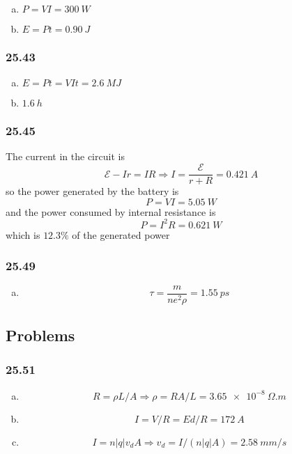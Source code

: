 \documentclass{article}
\begin{document}
\begin{enumerate}[(a)]
  \item $P = V I = \qty{300}{W}$

  \item $E = P t = \qty{0.90}{J}$
\end{enumerate}

\subsubsection{25.43}

\begin{enumerate}[(a)]
  \item $E = P t = V I t = \qty{2.6}{MJ}$

        \setcounter{enumi}{2}
  \item $\qty{1.6}{h}$
\end{enumerate}

\subsubsection{25.45}

The current in the circuit is \[\mathcal{E} - I r = I R \Rightarrow I = \frac{\mathcal{E}}{r + R} = \qty{0.421}{A}\] so the power generated by the battery is \[P = V I = \qty{5.05}{W}\] and the power consumed by internal resistance is \[P = I^2 R = \qty{0.621}{W}\] which is $12.3\%$ of the generated power

\subsubsection{25.49}

\begin{enumerate}[(a)]
  \item \[\tau = \frac{m}{n e^2 \rho} = \qty{1.55}{ps}\]
\end{enumerate}

\subsection{Problems}

\subsubsection{25.51}

\begin{enumerate}[(a)]
  \item \[R = \rho L / A \Rightarrow \rho = R A / L = \qty{3.65e-8}{\Omega.m}\]

  \item \[I = V / R = E d / R = \qty{172}{A}\]

  \item \[I = n |q| v_d A \Rightarrow v_d = I / (n |q| A) = \qty{2.58}{mm/s}\]
\end{enumerate}
\end{document}
